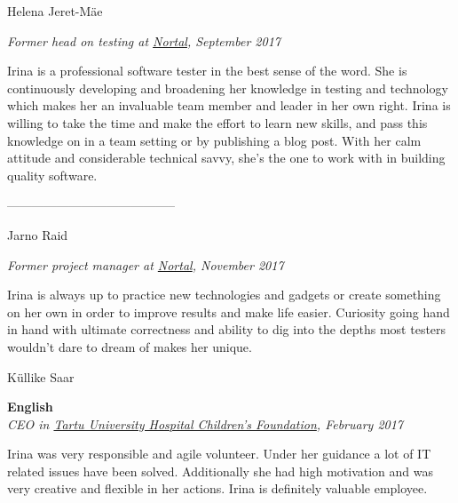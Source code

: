 \documentclass[a4paper, 12pt]{article}
\begin{document}
\newpage

\begin{center}
\LARGE{Helena Jeret-Mäe}
\end{center}

\begin{center}
\textit{Former head on testing at \href{https://nortal.com}{Nortal}, September 2017}
\end{center}

Irina is a professional software tester in the best sense of the word. She is continuously developing and broadening her knowledge in testing and technology which makes her an invaluable team member and leader in her own right. Irina is willing to take the time and make the effort to learn new skills, and pass this knowledge on in a team setting or by publishing a blog post. With her calm attitude and considerable technical savvy, she's the one to work with in building quality software.

\begin{center}
\------------------------------------------
\end{center}

\begin{center}
\LARGE{Jarno Raid}
\end{center}

\begin{center}
\textit{Former project manager at \href{https://nortal.com}{Nortal}, November 2017}
\end{center}

Irina is always up to practice new technologies and gadgets or create something on her own in order to improve results and make life easier. Curiosity going hand in hand with ultimate correctness and ability to dig into the depths most testers wouldn't dare to dream of makes her unique.

\newpage

\begin{center}
\LARGE{Küllike Saar}
\end{center}

\begin{center}
\textbf{English}\\
\textit{CEO in \href{https://www.lastefond.ee}{Tartu University Hospital Children's Foundation}, February 2017}
\end{center}

Irina was very responsible and agile volunteer. Under her guidance a lot of IT related issues have been solved. Additionally she had high motivation and was very creative and flexible in her actions. Irina is definitely valuable employee.
\end{document}
